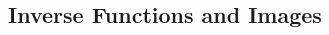 \documentclass[8pt,landscape]{article}
\begin{document}
\begin{multicols}{3}
    \subsection{Inverse Functions and Images}









\end{multicols}
\end{document}
